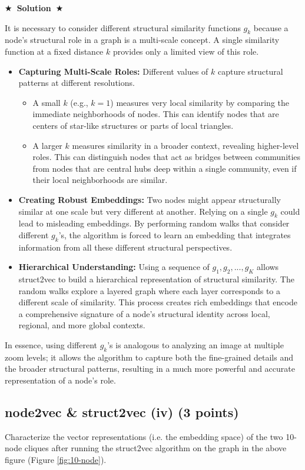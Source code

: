 \documentclass{article}
\numberwithin{figure}{section}
\newcommand{\Solution}[1]{%
	{%
		\medskip
		\color{red}
		\bf $\bigstar$~\sf\textbf{Solution}~$\bigstar$ \sf
		#1
	}
	\bigskip
}
\begin{document}
	\Solution{
		It is necessary to consider different structural similarity functions $g_k$ because a node's structural role in a graph is a multi-scale concept. A single similarity function at a fixed distance $k$ provides only a limited view of this role.
		
		\begin{itemize}
			\item \textbf{Capturing Multi-Scale Roles:} Different values of $k$ capture structural patterns at different resolutions.
			\begin{itemize}
				\item A small $k$ (e.g., $k=1$) measures very local similarity by comparing the immediate neighborhoods of nodes. This can identify nodes that are centers of star-like structures or parts of local triangles.
				\item A larger $k$ measures similarity in a broader context, revealing higher-level roles. This can distinguish nodes that act as bridges between communities from nodes that are central hubs deep within a single community, even if their local neighborhoods are similar.
			\end{itemize}
			
			\item \textbf{Creating Robust Embeddings:} Two nodes might appear structurally similar at one scale but very different at another. Relying on a single $g_k$ could lead to misleading embeddings. By performing random walks that consider different $g_k$'s, the algorithm is forced to learn an embedding that integrates information from all these different structural perspectives.
			
			\item \textbf{Hierarchical Understanding:} Using a sequence of $g_1, g_2, ..., g_K$ allows struct2vec to build a hierarchical representation of structural similarity. The random walks explore a layered graph where each layer corresponds to a different scale of similarity. This process creates rich embeddings that encode a comprehensive signature of a node's structural identity across local, regional, and more global contexts.
		\end{itemize}
		In essence, using different $g_k$'s is analogous to analyzing an image at multiple zoom levels; it allows the algorithm to capture both the fine-grained details and the broader structural patterns, resulting in a much more powerful and accurate representation of a node's role.
	}
	
	\subsection{node2vec \& struct2vec (iv) (3 points)}
	Characterize the vector representations (i.e. the embedding space) of the two 10-node cliques after running the struct2vec algorithm on the graph in the above figure (Figure \ref{fig:10-node}).
	
\end{document}
